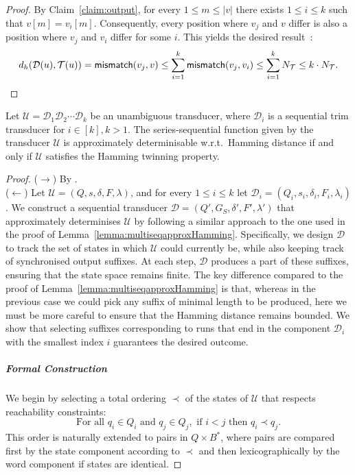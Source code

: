 \documentclass[a4paper,UKenglish,cleveref, autoref, thm-restate,authorcolumns, colorlinks]{lipics-v2021}
\newcommand\calD{\mathcal{D}}
\newcommand\calT{\mathcal{T}}
\newcommand\calU{\mathcal{U}}
\newcommand{\dHam}[2]{d_{h}(#1,#2)}
\begin{document}
{\begin{proof}
    By Claim~\ref{claim:output}, for every $1 \leq m \leq |v|$
    there exists $1 \leq i \leq k$ such that $v[m] = v_i[m]$.
    Consequently, every position where $v_j$ and $v$ differ
    is also a position where $v_j$ and $v_i$ differ for some $i$.
    This yields the desired result~: 
    \[
        \dHam{\calD(u)}{\calT(u)}
        = \textsf{mismatch}(v_j,v) \leq \sum_{i=1}^k \textsf{mismatch}(v_j,v_i) \leq \sum_{i=1}^k N_\calT \leq k \cdot N_\calT.\qedhere
    \]
\end{proof}
\begin{lemma} \label{lemma:seriesseqapproxHamming}
    Let $\calU = \calD_1 \calD_2 \cdots \calD_k$ be an unambiguous transducer,
    where $\calD_i$ is a sequential trim transducer for $i \in [k], k>1$.
    The series-sequential function given by the transducer $\calU$
    is approximately determinisable w.r.t.~Hamming distance
    if and only if $\calU$ satisfies the Hamming twinning property.
\end{lemma}



\begin{proof} ($\rightarrow$) By .\\
    ($\leftarrow$) Let $\calU = (Q,s,\delta,F,\lambda)$, and for every $1 \leq i \leq k$ let $\calD_i = (Q_i,s_i,\delta_i,F_i,\lambda_i)$.
    We construct a sequential transducer $\calD = (Q',G_S,\delta',F',\lambda')$ that approximately determinises $\mathcal{U}$
    by following a similar approach to the one used in the proof of Lemma~\ref{lemma:multiseqapproxHamming}.
    Specifically, we design $\calD$ to track the set of states in which $\mathcal{U}$ could currently be,
    while also keeping track of synchronised output suffixes.
    At each step, $\calD$ produces a part of these suffixes, ensuring that the state space remains finite.
    The key difference compared to the proof of Lemma~\ref{lemma:multiseqapproxHamming} is that,
    whereas in the previous case we could pick any suffix of minimal length to be produced,
    here we must be more careful to ensure that the Hamming distance remains bounded.
    We show that selecting suffixes corresponding to runs that end in the component $\calD_i$
    with the smallest index $i$ guarantees the desired outcome.
    

    \subparagraph*{Formal Construction}
    We begin by selecting a total ordering $\prec$ of the states of $\calU$
    that respects reachability constraints:
    \[
        \text{For all } q_i \in Q_i \text{ and } q_j \in Q_j, \text{ if } i < j \text{ then } q_i \prec q_j.
    \]
    This order is naturally extended to pairs in $Q \times B^*$,
    where pairs are compared first by the state component according to $\prec$
    and then lexicographically by the word component if states are identical.
    

\end{proof}}
\end{document}
